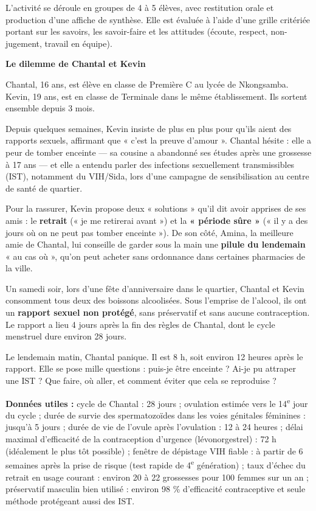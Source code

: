\documentclass[11pt]{article}
\newcounter{popsec}
\newcounter{popsub}
\newcommand{\courssub}[1]{%
  \stepcounter{popsub}%
  \par\vspace{9pt}\noindent{\popxbold\fontsize{11.5}{13}\selectfont\color{popink}{\color{poporange}\thepopsec.\thepopsub}\hspace{6pt}#1}\par\nopagebreak\vspace{4pt}
}
\begin{document}
L'activité se déroule en groupes de 4 à 5 élèves, avec restitution orale et production d'une affiche de synthèse. Elle est évaluée à l'aide d'une grille critériée portant sur les savoirs, les savoir-faire et les attitudes (écoute, respect, non-jugement, travail en équipe).

\courssub{Situation}

\textbf{Le dilemme de Chantal et Kevin}

Chantal, 16 ans, est élève en classe de Première C au lycée de Nkongsamba. Kevin, 19 ans, est en classe de Terminale dans le même établissement. Ils sortent ensemble depuis 3 mois.

Depuis quelques semaines, Kevin insiste de plus en plus pour qu'ils aient des rapports sexuels, affirmant que « c'est la preuve d'amour ». Chantal hésite : elle a peur de tomber enceinte — sa cousine a abandonné ses études après une grossesse à 17 ans — et elle a entendu parler des infections sexuellement transmissibles (IST), notamment du VIH/Sida, lors d'une campagne de sensibilisation au centre de santé de quartier.

Pour la rassurer, Kevin propose deux « solutions » qu'il dit avoir apprises de ses amis : le \textbf{retrait} (« je me retirerai avant ») et la \textbf{« période sûre »} (« il y a des jours où on ne peut pas tomber enceinte »). De son côté, Amina, la meilleure amie de Chantal, lui conseille de garder sous la main une \textbf{pilule du lendemain} « au cas où », qu'on peut acheter sans ordonnance dans certaines pharmacies de la ville.

Un samedi soir, lors d'une fête d'anniversaire dans le quartier, Chantal et Kevin consomment tous deux des boissons alcoolisées. Sous l'emprise de l'alcool, ils ont un \textbf{rapport sexuel non protégé}, sans préservatif et sans aucune contraception. Le rapport a lieu 4 jours après la fin des règles de Chantal, dont le cycle menstruel dure environ 28 jours.

Le lendemain matin, Chantal panique. Il est 8 h, soit environ 12 heures après le rapport. Elle se pose mille questions : puis-je être enceinte ? Ai-je pu attraper une IST ? Que faire, où aller, et comment éviter que cela se reproduise ?

\textbf{Données utiles :} cycle de Chantal : 28 jours ; ovulation estimée vers le 14\textsuperscript{e} jour du cycle ; durée de survie des spermatozoïdes dans les voies génitales féminines : jusqu'à 5 jours ; durée de vie de l'ovule après l'ovulation : 12 à 24 heures ; délai maximal d'efficacité de la contraception d'urgence (lévonorgestrel) : 72 h (idéalement le plus tôt possible) ; fenêtre de dépistage VIH fiable : à partir de 6 semaines après la prise de risque (test rapide de 4\textsuperscript{e} génération) ; taux d'échec du retrait en usage courant : environ 20 à 22 grossesses pour 100 femmes sur un an ; préservatif masculin bien utilisé : environ 98 \% d'efficacité contraceptive et seule méthode protégeant aussi des IST.
\end{document}
